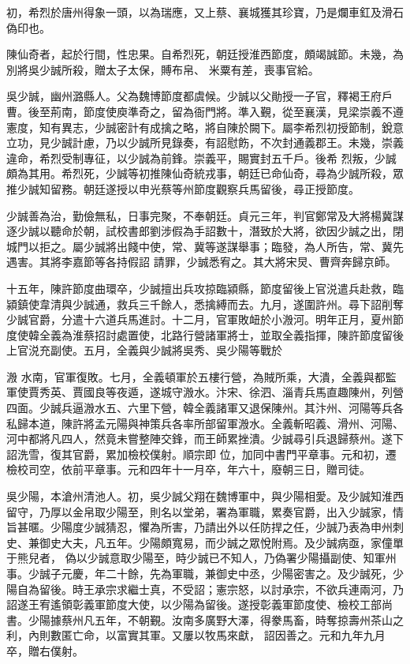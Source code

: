\begin{pinyinscope}
 初，希烈於唐州得象一頭，以為瑞應，又上蔡、襄城獲其珍寶，乃是爛車釭及滑石偽印也。



 陳仙奇者，起於行間，性忠果。自希烈死，朝廷授淮西節度，頗竭誠節。未幾，為別將吳少誠所殺，贈太子太保，賻布帛、
 米粟有差，喪事官給。



 吳少誠，幽州潞縣人。父為魏博節度都虞候。少誠以父勛授一子官，釋褐王府戶曹。後至荊南，節度使庾準奇之，留為衙門將。準入覲，從至襄漢，見梁崇義不遵憲度，知有異志，少誠密計有成擒之略，將自陳於闕下。屬李希烈初授節制，銳意立功，見少誠計慮，乃以少誠所見錄奏，有詔慰飭，不次封通義郡王。未幾，崇義違命，希烈受制專征，以少誠為前鋒。崇義平，賜實封五千戶。後希
 烈叛，少誠頗為其用。希烈死，少誠等初推陳仙奇統戎事，朝廷已命仙奇，尋為少誠所殺，眾推少誠知留務。朝廷遂授以申光蔡等州節度觀察兵馬留後，尋正授節度。



 少誠善為治，勤儉無私，日事完聚，不奉朝廷。貞元三年，判官鄭常及大將楊冀謀逐少誠以聽命於朝，試校書郎劉涉假為手詔數十，潛致於大將，欲因少誠之出，閉城門以拒之。屬少誠將出餞中使，常、冀等遂謀舉事；臨發，為人所告，常、冀先遇害。其將李嘉節等各持假詔
 請罪，少誠悉宥之。其大將宋炅、曹齊奔歸京師。



 十五年，陳許節度曲環卒，少誠擅出兵攻掠臨潁縣，節度留後上官涚遣兵赴救，臨潁鎮使韋清與少誠通，救兵三千餘人，悉擒縛而去。九月，遂圍許州。尋下詔削奪少誠官爵，分遣十六道兵馬進討。十二月，官軍敗衄於小溵河。明年正月，夏州節度使韓全義為淮蔡招討處置使，北路行營諸軍將士，並取全義指揮，陳許節度留後上官涚充副使。五月，全義與少誠將吳秀、吳少陽等戰於



 溵
 水南，官軍復敗。七月，全義頓軍於五樓行營，為賊所乘，大潰，全義與都監軍使賈秀英、賈國良等夜遁，遂城守溵水。汴宋、徐泗、淄青兵馬直趣陳州，列營四面。少誠兵逼溵水五、六里下營，韓全義諸軍又退保陳州。其汴州、河陽等兵各私歸本道，陳許將孟元陽與神策兵各率所部留軍溵水。全義斬昭義、滑州、河陽、河中都將凡四人，然竟未嘗整陣交鋒，而王師累挫潰。少誠尋引兵退歸蔡州。遂下詔洗雪，復其官爵，累加檢校僕射。順宗即
 位，加同中書門平章事。元和初，遷檢校司空，依前平章事。元和四年十一月卒，年六十，廢朝三日，贈司徒。



 吳少陽，本滄州清池人。初，吳少誠父翔在魏博軍中，與少陽相愛。及少誠知淮西留守，乃厚以金帛取少陽至，則名以堂弟，署為軍職，累奏官爵，出入少誠家，情旨甚暱。少陽度少誠猜忍，懼為所害，乃請出外以任防捍之任，少誠乃表為申州刺史、兼御史大夫，凡五年。少陽頗寬易，而少誠之眾悅附焉。及少誠病亟，家僮單于熊兒者，
 偽以少誠意取少陽至，時少誠已不知人，乃偽署少陽攝副使、知軍州事。少誠子元慶，年二十餘，先為軍職，兼御史中丞，少陽密害之。及少誠死，少陽自為留後。時王承宗求繼士真，不受詔；憲宗怒，以討承宗，不欲兵連兩河，乃詔遂王宥遙領彰義軍節度大使，以少陽為留後。遂授彰義軍節度使、檢校工部尚書。少陽據蔡州凡五年，不朝覲。汝南多廣野大澤，得豢馬畜，時奪掠壽州茶山之利，內則數匿亡命，以富實其軍。又屢以牧馬來獻，
 詔因善之。元和九年九月卒，贈右僕射。




\end{pinyinscope}
